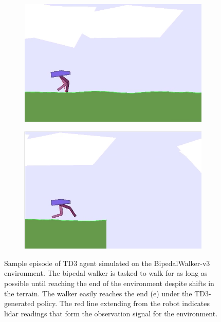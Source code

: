 \documentclass{article}
\begin{document}
\begin{figure}[!p]
\begin{subfigure}{0.18\textwidth}
  \caption{}
  \end{subfigure}
  \begin{subfigure}{0.18\textwidth}
  \centering
  \includegraphics[width=\textwidth]{figures/bipedal/f4}
  \caption{}
  \end{subfigure}
  \begin{subfigure}{0.18\textwidth}
  \centering
  \includegraphics[width=\textwidth]{figures/bipedal/f5}
  \caption{}
  \end{subfigure}
  \caption{Sample episode of TD3 agent simulated on the BipedalWalker-v3 environment. The bipedal walker is tasked to walk for as long as possible until reaching the end of the environment despite shifts in the terrain. The walker easily reaches the end (e) under the TD3-generated policy. The red line extending from the robot indicates lidar readings that form the observation signal for the environment.}
  \label{fig:bipedal_episode}
\end{figure}
\end{document}
